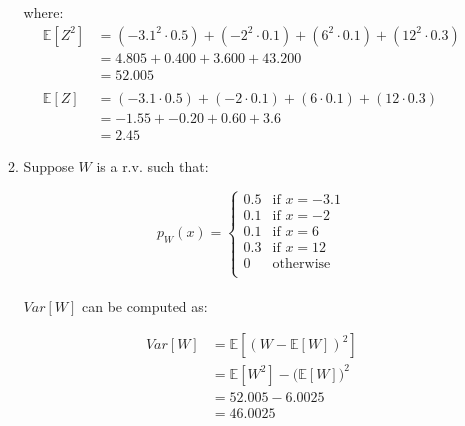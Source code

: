 \documentclass{article}
\begin{document}
\begin{enumerate}
\begin{enumerate}
        where:
        \begin{equation}
        \begin{split}
            \mathbb{E}{[Z^{2}]} &= (-3.1^{2}  \cdot 0.5) + (-2^{2} \cdot 0.1) + (6^{2} \cdot 0.1) + (12^{2} \cdot 0.3)\\
                &=4.805 + 0.400 + 3.600 + 43.200\\
                &=52.005\\~\\
            \mathbb{E}{[Z]} &= (-3.1  \cdot 0.5) + (-2 \cdot 0.1) + (6 \cdot 0.1) + (12 \cdot 0.3)\\
                &=-1.55 + -0.20 + 0.60 + 3.6\\
                &=2.45
        \end{split}
        \end{equation}
        
        \item Suppose $W$ is a r.v. such that:
        
            \begin{equation} \nonumber
                p_W(x) = 
                    \begin{cases}
                        0.5 & \text{if } x = -3.1\\
                        0.1 & \text{if } x = -2\\
                        0.1 & \text{if } x = 6\\
                        0.3 & \text{if } x = 12\\
                        0 & \text{otherwise}\\
                    \end{cases}
                \end{equation}\\
        
            $Var[W]$ can be computed as:

            \begin{equation}
            \begin{split}
                Var[W] &= \mathbb{E}{[(W - \mathbb{E}{[W]})^2]}\\
                &= \mathbb{E}{[W^2]} - (\mathbb{E}{[W])^2}\\
                &= 52.005 - 6.0025\\
                &= 46.0025
            \end{split}
            \end{equation}


\end{enumerate}
\end{enumerate}
\end{document}
